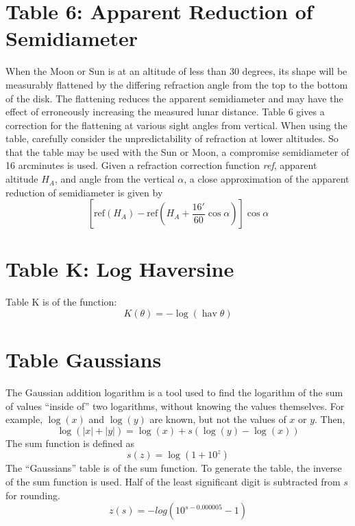 \documentclass[letterpaper]{article}
\DeclareMathOperator{\hav}{hav}
\numberwithin{equation}{section}
\begin{document}
\section{Table 6: Apparent Reduction of Semidiameter}
	When the Moon or Sun is at an altitude of less than 30 degrees, its shape will be measurably flattened by the differing refraction angle from the top to the bottom of the disk. The flattening reduces the apparent semidiameter and may have the effect of erroneously increasing the measured lunar distance. Table 6 gives a correction for the flattening at various sight angles from vertical. When using the table, carefully consider the unpredictability of refraction at lower altitudes. So that the table may be used with the Sun or Moon, a compromise semidiameter of 16 arcminutes is used. Given a refraction correction function \textit{ref}, apparent altitude $H_{\!A}$, and angle from the vertical $\alpha$, a close approximation of the apparent reduction of semidiameter is given by
	\begin{equation}
		\left[\text{ref}(H_{\!A}) - \text{ref}\left(H_{\!A} + \frac{16'}{60}\cos\alpha\right)\right]\cos\alpha
	\end{equation}

\section{Table K: Log Haversine}
	Table K is of the function:
	\begin{equation}
		K(\theta) = -\log(\hav\theta)
	\end{equation}

\section{Table Gaussians}
	The Gaussian addition logarithm is a tool used to find the logarithm of the sum of values ``inside of'' two logarithms, without knowing the values themselves. For example, $\log(x)$ and $\log(y)$ are known, but not the values of $x$ or $y$. Then,
	\begin{equation}
		\log(|x| + |y|) = \log(x) + s(\log(y) - \log(x))
	\end{equation}
	The sum function is defined as
	\begin{equation}
		s(z) = \log(1 + 10^z)
	\end{equation}
	The ``Gaussians'' table is of the sum function. To generate the table, the inverse of the sum function is used. Half of the least significant digit is subtracted from $s$ for rounding.
	\begin{equation}
		z(s) = -log(10^{s-0.000005}-1)
	\end{equation}
\end{document}
